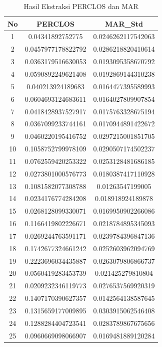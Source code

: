 \begin{longtable}{|c|c|c|}
  \caption{Hasil Ekstraksi PERCLOS dan MAR}
  \label{tb:EnergiKecepatan}                                   \\
  \hline
  \rowcolor[HTML]{C0C0C0}
  \textbf{No} & \textbf{PERCLOS} & \textbf{MAR\_Std} \\
  \hline
  1     & 0.04341892752775   & 0.0246262117542063 \\
  2     & 0.0457977178822792 & 0.0286218820410614 \\
  3     & 0.0363179516630053 & 0.0193095358670792 \\
  4     & 0.0590892249621408 & 0.0192869144310238 \\
  5     & 0.040213924189683  & 0.0164477395589993 \\
  6     & 0.0604693124683611 & 0.0164027809907854 \\
  7     & 0.0418428937527917 & 0.0175763328675194 \\
  8     & 0.0367099233744161 & 0.0170944891422672 \\
  9     & 0.0460220195416752 & 0.0297215001851705 \\
  10    & 0.1058752799978109 & 0.0290507174502237 \\
  11    & 0.0762559420253322 & 0.0253128481686185 \\
  12    & 0.0273801000576773 & 0.0180387417110928 \\
  13    & 0.1081582077308788 & 0.01263547199005   \\
  14    & 0.0234176774284208 & 0.018918924189878  \\
  15    & 0.0268128099330071 & 0.0169950902266086 \\
  16    & 0.1166419802226671 & 0.0218784895345093 \\
  17    & 0.0269244763591171 & 0.0239784396847136 \\
  18    & 0.1742677324661242 & 0.0252603962094769 \\
  19    & 0.2223696034435887 & 0.0263079806866737 \\
  20    & 0.0560419283453739 & 0.021425279810804  \\
  21    & 0.0209232346119773 & 0.0276537569920319 \\
  22    & 0.1407170390627357 & 0.0142564138587645 \\
  23    & 0.1315659177009895 & 0.0303915062546408 \\
  24    & 0.1288284404723541 & 0.0283789867675656 \\
  25    & 0.0960669098066907 & 0.0169481889120284 \\

\end{longtable}
